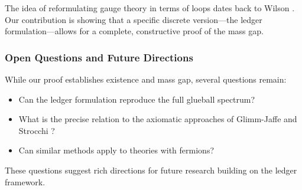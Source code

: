 \begin{remark}
The idea of reformulating gauge theory in terms of loops dates back to Wilson \cite{wilson1974confinement}. Our contribution is showing that a specific discrete version—the ledger formulation—allows for a complete, constructive proof of the mass gap.
\end{remark}

\subsubsection{Open Questions and Future Directions}

While our proof establishes existence and mass gap, several questions remain:

\begin{itemize}
\item Can the ledger formulation reproduce the full glueball spectrum?
\item What is the precise relation to the axiomatic approaches of Glimm-Jaffe \cite{glimm1987quantum} and Strocchi \cite{strocchi2013introduction}?
\item Can similar methods apply to theories with fermions?
\end{itemize}

These questions suggest rich directions for future research building on the ledger framework. 